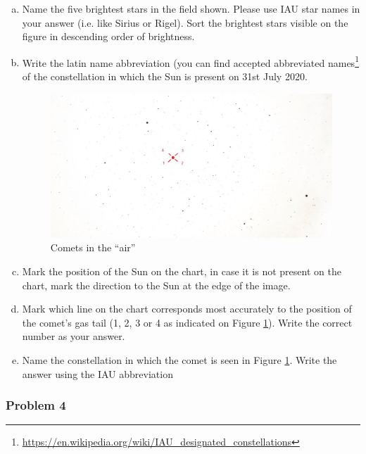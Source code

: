 \documentclass[a4paper,12pt]{extarticle}
\begin{document}
\begin{enumerate}[a.]
    \item Name the five brightest stars in the field shown. Please use IAU star names in your answer (i.e. like Sirius or Rigel). Sort the brightest stars visible on the figure in descending order of brightness.
    \item Write the latin name abbreviation (you can find accepted abbreviated names\footnote{\url{https://en.wikipedia.org/wiki/IAU_designated_constellations}} of the constellation in which the Sun is present on 31st July 2020.
    
\begin{figure}[H]
    \centering
    \includegraphics[width=0.95\linewidth]{GeCAA_1.png}
    \caption{Comets in the “air”}
    \label{GeCAA_1}
\end{figure}
    \item Mark the position of the Sun on the chart, in case it is not present on the chart, mark the direction to the Sun at the edge of the image.
    \item Mark which line on the chart corresponds most accurately to the position of the comet’s gas tail (1, 2, 3 or 4 as indicated on Figure \ref{GeCAA_1}). Write the correct number as your answer.
    \item Name the constellation in which the comet is seen in Figure \ref{GeCAA_1}. Write the answer using the IAU abbreviation
\end{enumerate}
\subsubsection{Problem 4}
\end{document}
